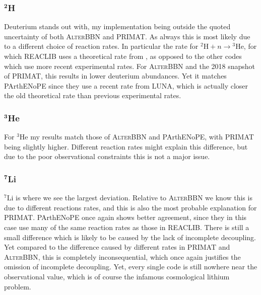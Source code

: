 \subsubsection{$^\textbf{2}$H}
Deuterium stands out with, my implementation being outside the quoted uncertainty of both \textsc{AlterBBN} and PRIMAT. As always this is most likely due to a different choice of reaction rates. In particular the rate for ${}^2\text{H}+n\rightarrow {}^3\text{He}$, for which REACLIB uses a theoretical rate from \textcite{Reaclibdphe3_2004}, as opposed to the other codes which use more recent experimental rates. For \textsc{AlterBBN} and the 2018 snapshot of PRIMAT, this results in lower deuterium abundances. Yet it matches PArthENoPE since they use a recent rate from LUNA, which is actually closer the old theoretical rate than previous experimental rates\cite{Luna_impact_Pisanti_2021}. 

\subsubsection{$^\textbf{3}$He}
For $^{3}$He my results match those of \textsc{AlterBBN} and PArthENoPE, with PRIMAT being slightly higher. Different reaction rates might explain this difference, but due to the poor observational constraints this is not a major issue. 

\subsubsection{$^\textbf{7}$Li}
${}^7\text{Li}$ is where we see the largest deviation. Relative to \textsc{AlterBBN} we know this is due to different reactions rates, and this is also the most probable explanation for PRIMAT. PArthENoPE once again shows better agreement, since they in this case use many of the same reaction rates as those in REACLIB. There is still a small difference which is likely to be caused by the lack of incomplete decoupling. Yet compared to the difference caused by different rates in PRIMAT and \textsc{AlterBBN}, this is completely inconsequential, which once again justifies the omission of incomplete decoupling. Yet, every single code is still nowhere near the observational value, which is of course the infamous cosmological lithium problem.


